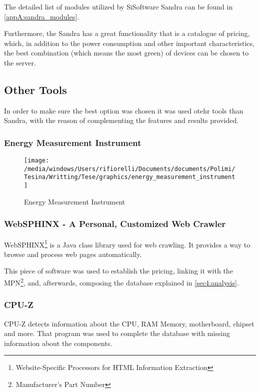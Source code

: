    The detailed list of modules utilized by SiSoftware Sandra can be found in \ref{appA:sandra_modules}.
    
    Furthermore, the Sandra has a great functionality that is a catalogue of pricing, which, in addition to the power consumption and other important characteristics, the best combination (which means the most green) of devices can be chosen to the server.
    
\subsection{Other Tools} \label{subsec3:other_tools}
    In order to make sure the best option was chosen it was used otehr tools than Sandra, with the reason of complementing the features and results provided. 
    
\subsubsection{Energy Measurement Instrument} \label{subsubsec3:measurement_instrument}
    \begin{figure}[!htb]
        \centering
            \texttt{[image: /media/windows/Users/rifiorelli/Documents/documents/Polimi/Tesina/Writting/Tese/graphics/energy\_measurement\_instrument]}
            \caption{Energy Measurement Instrument}
        \label{fig:energy_measurement_instrument}
    \end{figure}

\subsubsection{WebSPHINX - A Personal, Customized Web Crawler} \label{subsubsec3:websphinx}
    WebSPHINX\footnote{Website-Specific Processors for HTML Information Extraction} is a Java class library used for web crawling. It provides a way to browse and process web pages automatically.
    
    This piece of software was used to establish the pricing, linking it with the MPN\footnote{Manufacturer's Part Number}, and, afterwards, composing the database explained in \ref{sec4:analysis}. 

\subsubsection{CPU-Z} \label{subsubsec3:cpu-z}
    CPU-Z detects information about the CPU, RAM Memory, motherboard, chipset and more. That program was used to complete the database with missing information about the components.

